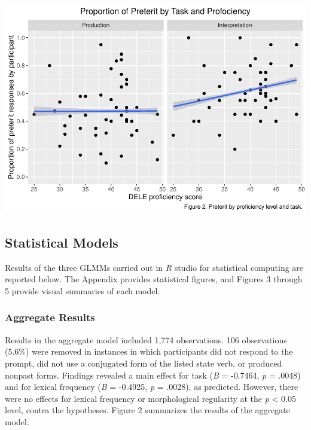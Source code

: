 \documentclass[
  english,
  man,floatsintext]{apa6}
\begin{document}
\includegraphics{Final-Manuscript_files/figure-latex/generate-prof-plot-1.pdf}

\hypertarget{statistical-models}{%
\subsection{Statistical Models}\label{statistical-models}}

Results of the three GLMMs carried out in \emph{R} studio for statistical computing are reported below. The Appendix provides statistical figures, and Figures 3 through 5 provide visual summaries of each model.

\hypertarget{aggregate-results}{%
\subsubsection{Aggregate Results}\label{aggregate-results}}

Results in the aggregate model included 1,774 observations. 106 observations (5.6\%) were removed in instances in which participants did not respond to the prompt, did not use a conjugated form of the listed state verb, or produced nonpast forms. Findings revealed a main effect for task (\emph{B} = -0.7464, \emph{p} = .0048) and for lexical frequency (\emph{B} = -0.4925, \emph{p} = .0028), as predicted. However, there were no effects for lexical frequency or morphological regularity at the \emph{p} \textless{} 0.05 level, contra the hypotheses. Figure 2 summarizes the results of the aggregate model.
\end{document}
